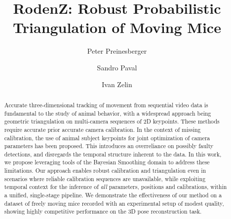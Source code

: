 \documentclass[sigconf, nonacm]{acmart}
\begin{document}
\title[Robust Probabilistic Triangulation of Moving Mice]{RodenZ: Robust Probabilistic Triangulation of Moving Mice}

\author{Peter Preinesberger}
\author{Sandro Paval}

\author{Ivan Zelin}


\begin{abstract}
Accurate three-dimensional tracking of movement from sequential video data is fundamental to the study of animal behavior, with a widespread approach being geometric triangulation on multi-camera sequences of 2D keypoints. These methods require accurate prior accurate camera calibration. In the context of missing calibration, the use of animal subject keypoints for joint optimization of camera parameters has been proposed. This introduces an overreliance on possibly faulty detections, and disregards the temporal structure inherent to the data. In this work, we propose leveraging tools of the Bayesian Smoothing domain to address these limitations. Our approach enables robust calibration and triangulation even in scenarios where reliable calibration sequences are unavailable, while exploiting temporal context for the inference of \emph{all} parameters, positions and calibrations, within a unified, single-stage pipeline. We demonstrate the effectiveness of our method on a dataset of freely moving mice recorded with an experimental setup of modest quality, showing highly competitive performance on the 3D pose reconstruction task.
\end{abstract}
\end{document}
